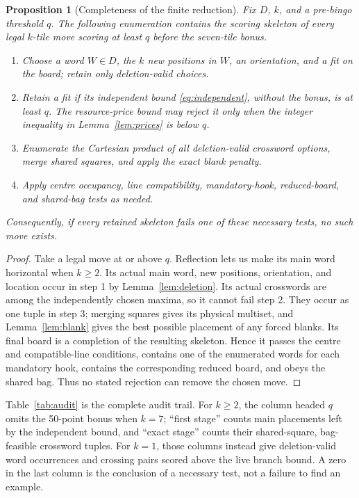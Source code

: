 \documentclass{article}
\theoremstyle{plain}
\newtheorem{proposition}[theorem]{Proposition}
\begin{document}
\begin{proposition}[Completeness of the finite reduction]
\label{prop:complete}
Fix $D$, $k$, and a pre-bingo threshold $q$. The following enumeration contains
the scoring skeleton of every legal $k$-tile move scoring at least $q$ before
the seven-tile bonus.
\begin{enumerate}
\item Choose a word $W\in D$, the $k$ new positions in $W$, an orientation,
and a fit on the board; retain only deletion-valid choices.
\item Retain a fit if its independent bound \eqref{eq:independent}, without the
bonus, is at least $q$. The resource-price bound may reject it only when the
integer inequality in Lemma~\ref{lem:prices} is below $q$.
\item Enumerate the Cartesian product of all deletion-valid crossword options,
merge shared squares, and apply the exact blank penalty.
\item Apply centre occupancy, line compatibility, mandatory-hook, reduced-board,
and shared-bag tests as needed.
\end{enumerate}
Consequently, if every retained skeleton fails one of these necessary tests,
no such move exists.
\end{proposition}
\begin{proof}
Take a legal move at or above $q$. Reflection lets us make its main word
horizontal when $k\ge2$. Its actual main word, new positions, orientation, and
location occur in step 1 by Lemma~\ref{lem:deletion}. Its actual crosswords are
among the independently chosen maxima, so it cannot fail step 2. They occur as
one tuple in step 3; merging squares gives its physical multiset, and
Lemma~\ref{lem:blank} gives the best possible placement of any forced blanks.
Its final board is a completion of the resulting skeleton. Hence it passes the
centre and compatible-line conditions, contains one of the enumerated words
for each mandatory hook, contains the corresponding reduced board, and obeys
the shared bag. Thus no stated rejection can remove the chosen move.
\end{proof}

Table~\ref{tab:audit} is the complete audit trail. For $k\ge2$, the column
headed $q$ omits the 50-point bonus when $k=7$; ``first stage'' counts main
placements left by the independent bound, and ``exact stage'' counts their
shared-square, bag-feasible crossword tuples. For $k=1$, those columns instead
give deletion-valid word occurrences and crossing pairs scored above the live
branch bound. A zero in the last column is the conclusion of a necessary test,
not a failure to find an example.
\end{document}
